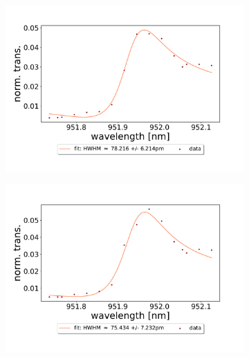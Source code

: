 \begin{figure}[h!]
    \centering
    \begin{subfigure}[b]{0.49\textwidth}
        \includegraphics[width=\textwidth]{figures/results/double fano fits/20250326/453um_M3:M5_fit_1.pdf}
        \caption{}
        \label{fig:453um_M3:M5_fit_1}
    \end{subfigure}
    \begin{subfigure}[b]{0.49\textwidth}
        \includegraphics[width=\textwidth]{figures/results/double fano fits/20250326/453um_M3:M5_fit_2.pdf}
        \caption{}
        \label{fig:453um_M3:M5_fit_2}
    \end{subfigure}
    \begin{subfigure}[b]{0.49\textwidth}

\end{subfigure}
\end{figure}
